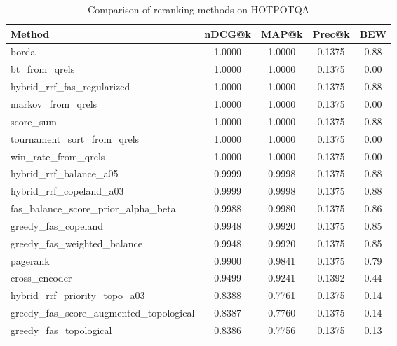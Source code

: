 \begin{table}[ht]
\centering
\caption{Comparison of reranking methods on HOTPOTQA}
\label{tab:modern_baselines_hotpotqa}
\begin{tabular}{lcccc}
\toprule
Method & nDCG@k & MAP@k & Prec@k & BEW \\
\midrule
borda & 1.0000 & 1.0000 & 0.1375 & 0.88 \\
bt\_from\_qrels & 1.0000 & 1.0000 & 0.1375 & 0.00 \\
hybrid\_rrf\_fas\_regularized & 1.0000 & 1.0000 & 0.1375 & 0.88 \\
markov\_from\_qrels & 1.0000 & 1.0000 & 0.1375 & 0.00 \\
score\_sum & 1.0000 & 1.0000 & 0.1375 & 0.88 \\
tournament\_sort\_from\_qrels & 1.0000 & 1.0000 & 0.1375 & 0.00 \\
win\_rate\_from\_qrels & 1.0000 & 1.0000 & 0.1375 & 0.00 \\
hybrid\_rrf\_balance\_a05 & 0.9999 & 0.9998 & 0.1375 & 0.88 \\
hybrid\_rrf\_copeland\_a03 & 0.9999 & 0.9998 & 0.1375 & 0.88 \\
fas\_balance\_score\_prior\_alpha\_beta & 0.9988 & 0.9980 & 0.1375 & 0.86 \\
greedy\_fas\_copeland & 0.9948 & 0.9920 & 0.1375 & 0.85 \\
greedy\_fas\_weighted\_balance & 0.9948 & 0.9920 & 0.1375 & 0.85 \\
pagerank & 0.9900 & 0.9841 & 0.1375 & 0.79 \\
cross\_encoder & 0.9499 & 0.9241 & 0.1392 & 0.44 \\
hybrid\_rrf\_priority\_topo\_a03 & 0.8388 & 0.7761 & 0.1375 & 0.14 \\
greedy\_fas\_score\_augmented\_topological & 0.8387 & 0.7760 & 0.1375 & 0.14 \\
greedy\_fas\_topological & 0.8386 & 0.7756 & 0.1375 & 0.13 \\
\bottomrule
\end{tabular}
\end{table}